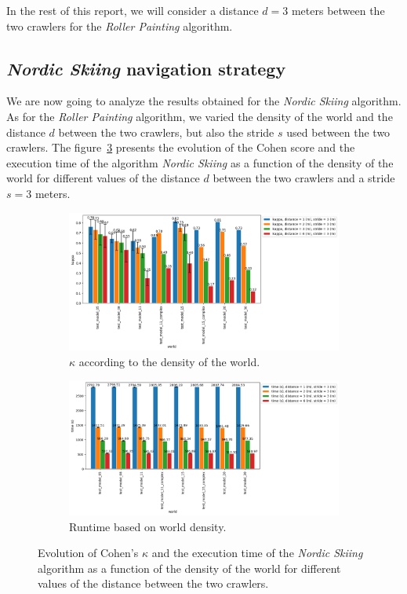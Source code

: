 \documentclass[english,RandD]{rapportPFE}  %
\begin{document}
			In the rest of this report, we will consider a distance $d = 3$ meters between the two crawlers for the \textit{Roller Painting} algorithm.
		\subsection*{\textit{Nordic Skiing} navigation strategy}
			We are now going to analyze the results obtained for the \textit{Nordic Skiing} algorithm.
			As for the \textit{Roller Painting} algorithm, we varied the density of the world and the distance $d$ between the two crawlers, but also the stride $s$ used between the two crawlers.
			The figure~\ref{fig:ski_nordique-world_d} presents the evolution of the Cohen score and the execution time of the algorithm \textit{Nordic Skiing} as a function of the density of the world for different values of the distance $d$ between the two crawlers and a stride $s = 3$ meters.

			\begin{figure}[h!]
				\centering
				\begin{subfigure}[t]{0.9\linewidth}
					\includegraphics[width=\linewidth]{graphics/ski_nordique-kappa_vs_world_for_each_d.png}
					\caption{$\kappa$ according to the density of the world.}
					\label{fig:ski_nordique-kappa_vs_world_d}
				\end{subfigure}
				\hfill
				\begin{subfigure}[t]{0.9\linewidth}
					\includegraphics[width=\linewidth]{graphics/ski_nordique-time_vs_world_for_each_d.png}
					\caption{Runtime based on world density.}
					\label{fig:ski_nordique-time_vs_world_d}
				\end{subfigure}
				\caption{Evolution of Cohen's $\kappa$ and the execution time of the \textit{Nordic Skiing} algorithm as a function of the density of the world for different values of the distance between the two crawlers.}
				\label{fig:ski_nordique-world_d}
			\end{figure}
\end{document}
